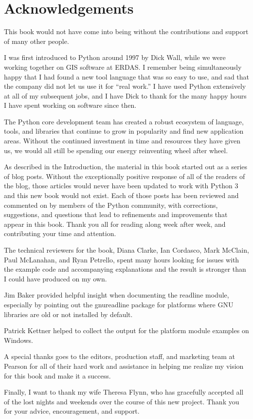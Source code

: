 \cleardoublepage
\chapter*{Acknowledgements}

\noindent This book would not have come into being without the contributions and
support of many other people.

I was first introduced to Python around 1997 by Dick Wall, while we
were working together on GIS software at ERDAS. I remember being
simultaneously happy that I had found a new tool language that was so
easy to use, and sad that the company did not let us use it for ``real
work.'' I have used Python extensively at all of my subsequent jobs,
and I have Dick to thank for the many happy hours I have spent working
on software since then.

The Python core development team has created a robust ecosystem of
language, tools, and libraries that continue to grow in popularity and
find new application areas. Without the continued investment in time
and resources they have given us, we would all still be spending our
energy reinventing wheel after wheel.

As described in the Introduction, the material in this book started
out as a series of blog posts. Without the exceptionally positive
response of all of the readers of the blog, those articles would never
have been updated to work with Python 3 and this new book would not
exist. Each of those posts has been reviewed and commented on by
members of the Python community, with corrections, suggestions, and
questions that lead to refinements and improvements that appear in
this book. Thank you all for reading along week after week, and
contributing your time and attention.

The technical reviewers for the book, Diana Clarke, Ian Cordasco, Mark
McClain, Paul McLanahan, and Ryan Petrello, spent many hours looking
for issues with the example code and accompanying explanations and the
result is stronger than I could have produced on my own.

Jim Baker provided helpful insight when documenting the readline
module, especially by pointing out the gnureadline package for
platforms where GNU libraries are old or not installed by default.

Patrick Kettner helped to collect the output for the platform module
examples on Windows.

A special thanks goes to the editors, production staff, and marketing
team at Pearson for all of their hard work and assistance in helping
me realize my vision for this book and make it a success.

Finally, I want to thank my wife Theresa Flynn, who has gracefully
accepted all of the lost nights and weekends over the course of this
new project. Thank you for your advice, encouragement, and support.
